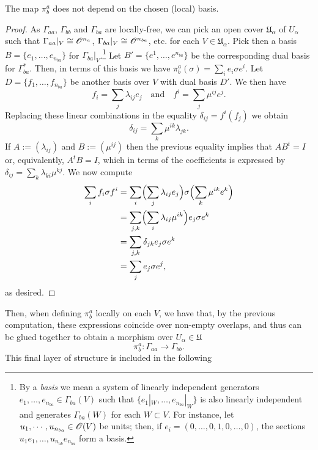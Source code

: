 \begin{proposition}\label{cardy_well_def}
  The map $\pi^a_b$ does not depend on the chosen (local) basis.
\end{proposition}
\begin{proof}
  As $\Gamma_{aa}$, $\Gamma_{bb}$ and $\Gamma_{ba}$ are locally-free,
  we can pick an open cover $\mathfrak{U}_\alpha$ of $U_\alpha$ such
  that $\Gamma_{aa}|_V\cong \mathscr{O}^{n_{a}}$, $\Gamma_{ba}|_V\cong
  \mathscr{O}^{n_{ba}}$, etc. for each $V\in \mathfrak{U}_\alpha$. Pick
  then a basis $B=\{e_1,\dots ,e_{n_{ba}}\}$ for
  $\Gamma_{ba}|_V$.\footnote{By a \emph{basis} we mean a system of
    linearly independent generators $e_1,\dots ,e_{n_{ba}}\in
    \Gamma_{ba}(V)$ such that $\{e_1|_W,\dots ,e_{n_{ba}}|_W\}$ is
    also linearly independent and generates $\Gamma_{ba}(W)$ for each
    $W\subset V$. For instance, let $u_1,\cdots ,u_{n_{ba}}\in
    \mathscr{O}(V)$ be units; then, if $e_i=(0,\dots ,0,1,0,\dots ,0)$,
    the sections $u_1e_1,\dots ,u_{n_{ab}}e_{n_{ba}}$ form a basis.}
  Let $B'=\{e^1,\dots ,e^{n_{ba}}\}$ be the corresponding dual basis
  for $\Gamma_{ba}^*$. Then, in terms of this basis we have $\pi_b^a
  (\sigma )=\sum_ie_i\sigma e^i$. Let $D=\{f_1,\dots ,f_{n_{ba}}\}$ be
  another basis over $V$ with dual basis $D'$. We then have
$$f_i=\sum_j\lambda_{ij}e_j \quad \text{and} \quad f^i=\sum_j\mu^{ij}e^j.$$
Replacing these linear combinations in the equality
$\delta_{ij}=f^i(f_j)$ we obtain
$$\delta_{ij}=\sum_k\mu^{ik}\lambda_{jk}.$$
If $A:=(\lambda_{ij})$ and $B:=(\mu^{ij})$ then the previous equality
implies that $AB^t=I$ or, equivalently, $A^tB=I$, which in terms of
the coefficients is expressed by
$\delta_{ij}=\sum_k\lambda_{ki}\mu^{kj}$. We now compute
$$
\begin{aligned}
  \sum_if_i\sigma f^i &= \sum_i\Bigl (\sum_j\lambda_{ij}e_j\Bigr )\sigma \Bigl (\sum_k\mu^{ik}e^k\Bigr ) \\
  &= \sum_{j,k}\Bigl (\sum_i\lambda_{ij}\mu^{ik}\Bigr )e_j\sigma e^k \\
  &=\sum_{j,k}\delta_{jk}e_j\sigma e^k \\
  &=\sum_je_j\sigma e^j, \\
\end{aligned}
$$
as desired.
\end{proof}

Then, when defining $\pi_b^a$ locally on each $V$, we have that, by
the previous computation, these expressions coincide over non-empty
overlaps, and thus can be glued together to obtain a morphism over
$U_\alpha \in \mathfrak{U}$
$$\pi_b^a :\Gamma_{aa}\longrightarrow \Gamma_{bb}.$$
This final layer of structure is included in the following

